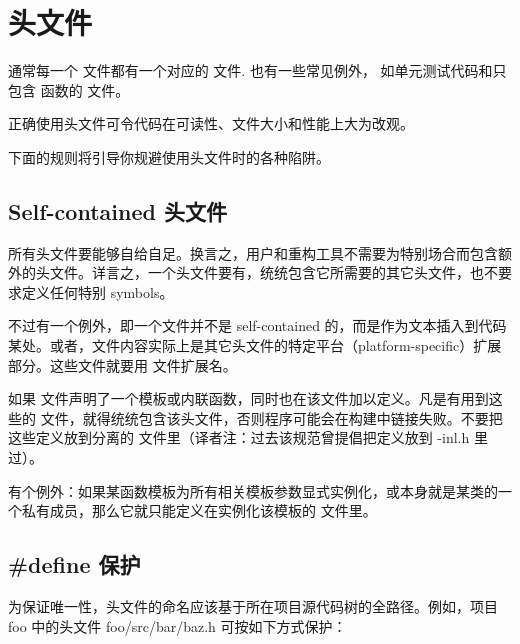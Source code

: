 \chapter{头文件}

通常每一个  文件都有一个对应的  文件. 也有一些常见例外， 如单元测试代码和只包含  函数的 文件。

正确使用头文件可令代码在可读性、文件大小和性能上大为改观。

下面的规则将引导你规避使用头文件时的各种陷阱。

\section{Self-contained 头文件} \label{self-contained-headers}


所有头文件要能够自给自足。换言之，用户和重构工具不需要为特别场合而包含额外的头文件。详言之，一个头文件要有，统统包含它所需要的其它头文件，也不要求定义任何特别 symbols。

不过有一个例外，即一个文件并不是 self-contained 的，而是作为文本插入到代码某处。或者，文件内容实际上是其它头文件的特定平台（platform-specific）扩展部分。这些文件就要用 文件扩展名。

如果  文件声明了一个模板或内联函数，同时也在该文件加以定义。凡是有用到这些的  文件，就得统统包含该头文件，否则程序可能会在构建中链接失败。不要把这些定义放到分离的  文件里（译者注：过去该规范曾提倡把定义放到 -inl.h 里过）。

有个例外：如果某函数模板为所有相关模板参数显式实例化，或本身就是某类的一个私有成员，那么它就只能定义在实例化该模板的  文件里。

\section{#define 保护} \label{pragma-once-guard}


为保证唯一性，头文件的命名应该基于所在项目源代码树的全路径。例如，项目 foo 中的头文件 foo/src/bar/baz.h 可按如下方式保护：

